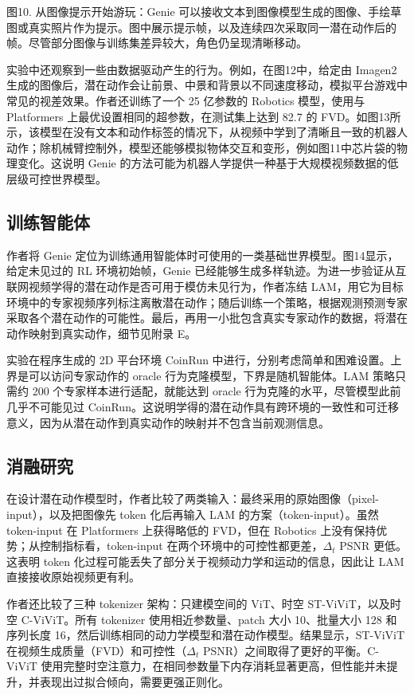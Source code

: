 \documentclass[10pt]{article}
\begin{document}
图10. 从图像提示开始游玩：Genie 可以接收文本到图像模型生成的图像、手绘草图或真实照片作为提示。图中展示提示帧，以及连续四次采取同一潜在动作后的帧。尽管部分图像与训练集差异较大，角色仍呈现清晰移动。

实验中还观察到一些由数据驱动产生的行为。例如，在图12中，给定由 Imagen2 生成的图像后，潜在动作会让前景、中景和背景以不同速度移动，模拟平台游戏中常见的视差效果。作者还训练了一个 25 亿参数的 Robotics 模型，使用与 Platformers 上最优设置相同的超参数，在测试集上达到 82.7 的 FVD。如图13所示，该模型在没有文本和动作标签的情况下，从视频中学到了清晰且一致的机器人动作；除机械臂控制外，模型还能够模拟物体交互和变形，例如图11中芯片袋的物理变化。这说明 Genie 的方法可能为机器人学提供一种基于大规模视频数据的低层级可控世界模型。

\subsection{训练智能体}

作者将 Genie 定位为训练通用智能体时可使用的一类基础世界模型。图14显示，给定未见过的 RL 环境初始帧，Genie 已经能够生成多样轨迹。为进一步验证从互联网视频学得的潜在动作是否可用于模仿未见行为，作者冻结 LAM，用它为目标环境中的专家视频序列标注离散潜在动作；随后训练一个策略，根据观测预测专家采取各个潜在动作的可能性。最后，再用一小批包含真实专家动作的数据，将潜在动作映射到真实动作，细节见附录 E。

实验在程序生成的 2D 平台环境 CoinRun 中进行，分别考虑简单和困难设置。上界是可以访问专家动作的 oracle 行为克隆模型，下界是随机智能体。LAM 策略只需约 200 个专家样本进行适配，就能达到 oracle 行为克隆的水平，尽管模型此前几乎不可能见过 CoinRun。这说明学得的潜在动作具有跨环境的一致性和可迁移意义，因为从潜在动作到真实动作的映射并不包含当前观测信息。

\subsection{消融研究}

在设计潜在动作模型时，作者比较了两类输入：最终采用的原始图像（pixel-input），以及把图像先 token 化后再输入 LAM 的方案（token-input）。虽然 token-input 在 Platformers 上获得略低的 FVD，但在 Robotics 上没有保持优势；从控制指标看，token-input 在两个环境中的可控性都更差，$\Delta_t$ PSNR 更低。这表明 token 化过程可能丢失了部分关于视频动力学和运动的信息，因此让 LAM 直接接收原始视频更有利。

作者还比较了三种 tokenizer 架构：只建模空间的 ViT、时空 ST-ViViT，以及时空 C-ViViT。所有 tokenizer 使用相近参数量、patch 大小 10、批量大小 128 和序列长度 16，然后训练相同的动力学模型和潜在动作模型。结果显示，ST-ViViT 在视频生成质量（FVD）和可控性（$\Delta_t$ PSNR）之间取得了更好的平衡。C-ViViT 使用完整时空注意力，在相同参数量下内存消耗显著更高，但性能并未提升，并表现出过拟合倾向，需要更强正则化。
\end{document}
